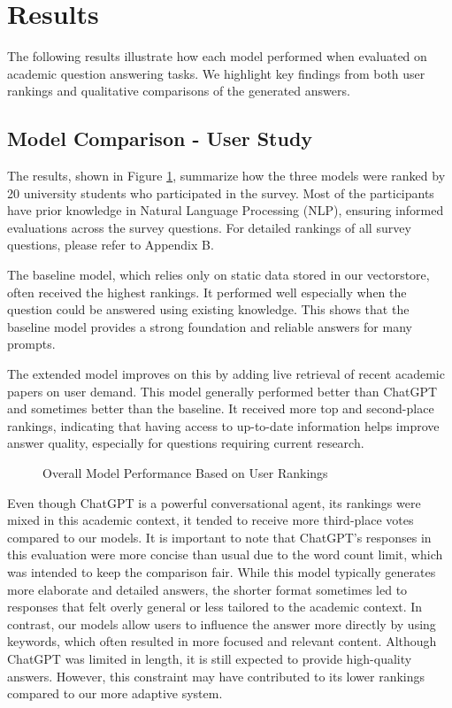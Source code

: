 \documentclass[fleqn,moreauthors,10pt]{ds_report}
\begin{document}
\section*{Results}

The following results illustrate how each model performed when evaluated on academic question answering tasks. We highlight key findings from both user rankings and qualitative comparisons of the generated answers.

\subsection*{Model Comparison - User Study}

The results, shown in Figure \ref{fig:summary}, summarize how the three models were ranked by 20 university students who participated in the survey. Most of the participants have prior knowledge in Natural Language Processing (NLP), ensuring informed evaluations across the survey questions. For detailed rankings of all survey questions, please refer to Appendix B.


The baseline model, which relies only on static data stored in our vectorstore, often received the highest rankings. It performed well especially when the question could be answered using existing knowledge. This shows that the baseline model provides a strong foundation and reliable answers for many prompts.

The extended model improves on this by adding live retrieval of recent academic papers on user demand. This model generally performed better than ChatGPT and sometimes better than the baseline. It received more top and second-place rankings, indicating that having access to up-to-date information helps improve answer quality, especially for questions requiring current research.


\begin{figure}[htbp]
    \centering
    
    \caption{Overall Model Performance Based on User Rankings}
    \label{fig:summary}
\end{figure}

Even though ChatGPT is a powerful conversational agent, its rankings were mixed in this academic context, it tended to receive more third-place votes compared to our models. It is important to note that ChatGPT’s responses in this evaluation were more concise than usual due to the word count limit, which was intended to keep the comparison fair. While this model typically generates more elaborate and detailed answers, the shorter format sometimes led to responses that felt overly general or less tailored to the academic context. In contrast, our models allow users to influence the answer more directly by using keywords, which often resulted in more focused and relevant content. Although ChatGPT was limited in length, it is still expected to provide high-quality answers. However, this constraint may have contributed to its lower rankings compared to our more adaptive system.
\end{document}
